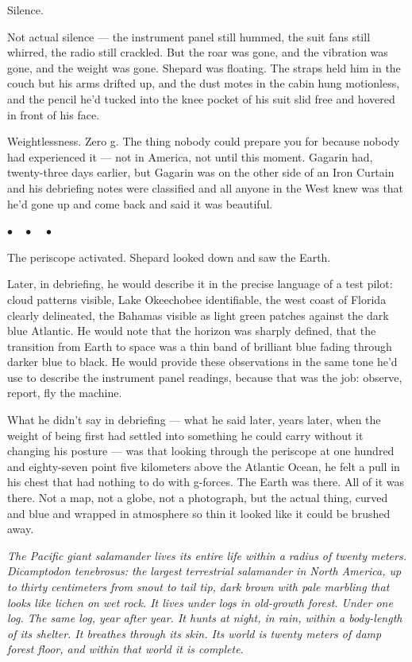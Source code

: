 \documentclass[12pt, letterpaper]{article}
\begin{document}
Silence.

Not actual silence --- the instrument panel still hummed, the suit fans still whirred, the radio still crackled. But the roar was gone, and the vibration was gone, and the weight was gone. Shepard was floating. The straps held him in the couch but his arms drifted up, and the dust motes in the cabin hung motionless, and the pencil he'd tucked into the knee pocket of his suit slid free and hovered in front of his face.

Weightlessness. Zero g. The thing nobody could prepare you for because nobody had experienced it --- not in America, not until this moment. Gagarin had, twenty-three days earlier, but Gagarin was on the other side of an Iron Curtain and his debriefing notes were classified and all anyone in the West knew was that he'd gone up and come back and said it was beautiful.

\begin{center}
$\bullet\quad\bullet\quad\bullet$
\end{center}

The periscope activated. Shepard looked down and saw the Earth.

Later, in debriefing, he would describe it in the precise language of a test pilot: cloud patterns visible, Lake Okeechobee identifiable, the west coast of Florida clearly delineated, the Bahamas visible as light green patches against the dark blue Atlantic. He would note that the horizon was sharply defined, that the transition from Earth to space was a thin band of brilliant blue fading through darker blue to black. He would provide these observations in the same tone he'd use to describe the instrument panel readings, because that was the job: observe, report, fly the machine.

What he didn't say in debriefing --- what he said later, years later, when the weight of being first had settled into something he could carry without it changing his posture --- was that looking through the periscope at one hundred and eighty-seven point five kilometers above the Atlantic Ocean, he felt a pull in his chest that had nothing to do with g-forces. The Earth was there. All of it was there. Not a map, not a globe, not a photograph, but the actual thing, curved and blue and wrapped in atmosphere so thin it looked like it could be brushed away.

\emph{The Pacific giant salamander lives its entire life within a radius of twenty meters. Dicamptodon tenebrosus: the largest terrestrial salamander in North America, up to thirty centimeters from snout to tail tip, dark brown with pale marbling that looks like lichen on wet rock. It lives under logs in old-growth forest. Under one log. The same log, year after year. It hunts at night, in rain, within a body-length of its shelter. It breathes through its skin. Its world is twenty meters of damp forest floor, and within that world it is complete.}
\end{document}
